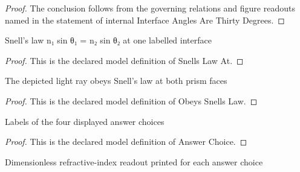 \begin{proof}
  The conclusion follows from the governing relations and figure readouts named in the statement of internal Interface Angles Are Thirty Degrees.
\end{proof}
\begin{definition}
  \label{def:physics:phyx-mini-0074:phyxminiproblems-problemphyxmini0074-snellslawat}
  Snell's law n₁ sin θ₁ = n₂ sin θ₂ at one labelled interface
\end{definition}
\begin{proof}
  This is the declared model definition of Snells Law At.
\end{proof}
\begin{definition}
  \label{def:physics:phyx-mini-0074:phyxminiproblems-problemphyxmini0074-obeyssnellslaw}
  The depicted light ray obeys Snell's law at both prism faces
\end{definition}
\begin{proof}
  This is the declared model definition of Obeys Snells Law.
\end{proof}
\begin{definition}
  \label{def:physics:phyx-mini-0074:phyxminiproblems-problemphyxmini0074-answerchoice}
  Labels of the four displayed answer choices
\end{definition}
\begin{proof}
  This is the declared model definition of Answer Choice.
\end{proof}
\begin{definition}
  \label{def:physics:phyx-mini-0074:phyxminiproblems-problemphyxmini0074-answerchoice-refractiveindexreadout}
  Dimensionless refractive-index readout printed for each answer choice
\end{definition}
